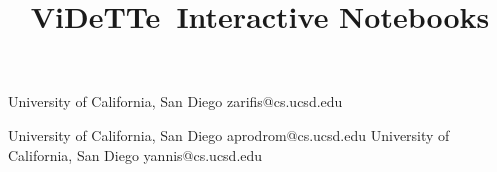 \documentclass[numbers]{sigplanconf}
\begin{document}
\sectionfont{\MakeUppercase}

\newcommand{\projname}[0]{ViDeTTe}
\newcommand{\angular}[0]{AngularJS}
\newcommand{\react}[0]{React}

\title{\projname\ Interactive Notebooks}

           {University of California, San Diego}
           {zarifis@cs.ucsd.edu}
           
           {University of California, San Diego}
           {aprodrom@cs.ucsd.edu}
           {University of California, San Diego}
           {yannis@cs.ucsd.edu}           
                      
\maketitle



 

\begin{sloppypar}

%
%

%


%

%

%


%
%

%

%


%

%

%



%





%
%

\end{sloppypar}



{
\scriptsize 

}


%
%

%
\end{document}
